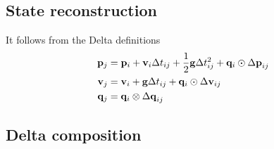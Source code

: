 \subsection{State reconstruction}

It follows from the Delta definitions
%
\begin{align}
\begin{split}
{\bf p}_j &= {\bf p}_i + {\bf v}_i\Delta t_{ij} + \frac12{\bf g}\Delta t_{ij}^2 + {\bf q}_i\odot{\Delta{\bf p}}_{ij} \\
{\bf v}_j &= {\bf v}_i + {\bf g}\Delta t_{ij} + {\bf q}_i\odot{\Delta{\bf v}}_{ij} \\
{\bf q}_j &= {\bf q}_i\otimes{\Delta{\bf q}}_{ij}   
\end{split}
\end{align}

\subsection{Delta composition}

